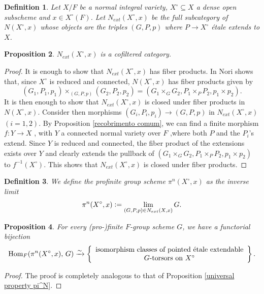 \documentclass[a4paper,english,12pt]{amsart}
\newtheorem{definition}{Definition}[section]
\newtheorem{proposition}[definition]{Proposition}
\numberwithin{equation}{section}
\newcommand{\defeq}{\vcentcolon=}
\newcommand{\Hom}{\textup{Hom}}
\renewcommand{\_}{\rule{0.25cm}{0.4pt}}
\begin{document}
\begin{definition}
Let $X/F$ be a normal integral variety, $X^{\circ}\subseteq X$ a dense open subscheme and $x\in X^{\circ}(F)$. Let $N_{ext}(X^{\circ},x)$ be the full subcategory of $N(X^{\circ},x)$ whose objects are the triples $(G,P,p)$ where $P\to X^{\circ}$ étale extends to $X$. 
\end{definition}

\begin{proposition}
$N_{ext}(X^{\circ},x)$ is a cofiltered category.
\end{proposition}
\begin{proof}
    It is enough to show that $N_{ext}(X^{\circ},x)$ has fiber products. In \cite[Proposition 2, p.85]{Nori1982-tm} Nori shows that, since $X^{\circ}$ is reduced and connected, $N(X^{\circ},x)$ has fiber products given by
    \[
        (G_{1},P_{1},p_{1})\times_{(G,P,p)}(G_{2},P_{2},p_{2})=(G_{1}\times_{G}G_{2},P_{1}\times_{P}P_{2},p_{1}\times p_{2}).
    \]
    It is then enough to show that $N_{ext}(X^{\circ},x)$ is closed under fiber products in $N(X^{\circ},x)$. Consider then morphisms $(G_{i},P_{i},p_{i})\to (G,P,p)$ in $N_{ext}(X^{\circ},x)$ $(i=1,2)$. By Proposition \ref{recobrimento comum}, we can find a finite morphism $f\colon Y\to X$ , with $Y$ a connected normal variety over $F$ ,where both $P$ and the $P_{i}$'s extend. Since $Y$ is reduced and connected, the fiber product of the extensions exists over $Y$ and clearly extends the pullback of $(G_{1}\times_{G}G_{2},P_{1}\times_{P}P_{2},p_{1}\times p_{2})$ to $f^{-1}(X^{\circ})$. This shows that $N_{ext}(X^{\circ},x)$ is closed under fiber products.
\end{proof}

\begin{definition}
We define the profinite group scheme $\pi^{n}(X^{\circ},x)$ as the inverse limit
\[
\pi^{n}(X^{\circ},x)\defeq\lim_{(G,P,p)\in N_{ext}(X,x)} G.
\]
\end{definition}

\begin{proposition}
For every (pro-)finite $F$-group scheme $G$, we have a functorial bijection
\[
\Hom_{F}(\pi^{n}(X^{\circ},x),\,G)\xrightarrow{\sim} \left\{
\begin{array}{c}
\text{isomorphism classes of pointed étale extendable}\\
\text{$G$-torsors on $X^{\circ}$}
\end{array}
\right\}.
\]
\end{proposition}
\begin{proof}
The proof is completely analogous to that of Proposition \ref{universal property pi^N}.
\end{proof}
\end{document}
